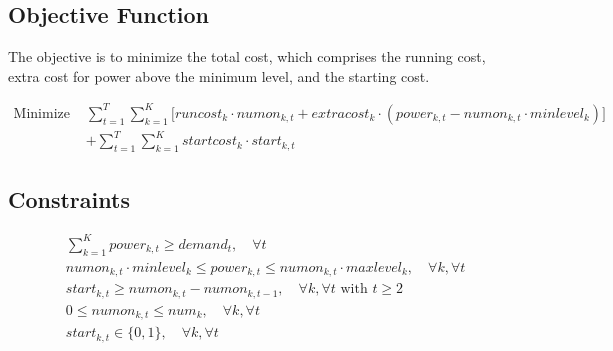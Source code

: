 \documentclass{article}
\begin{document}
\subsection{Objective Function}
The objective is to minimize the total cost, which comprises the running cost, extra cost for power above the minimum level, and the starting cost. 

\begin{align}
\text{Minimize } & \sum_{t=1}^{T} \sum_{k=1}^{K} \big[ runcost_k \cdot numon_{k,t} + extracost_k \cdot (power_{k,t} - numon_{k,t} \cdot minlevel_k) \big] \\
& + \sum_{t=1}^{T} \sum_{k=1}^{K} startcost_k \cdot start_{k,t}
\end{align}

\subsection{Constraints}
\begin{align}
& \sum_{k=1}^{K} power_{k,t} \geq demand_t, \quad \forall t \\

& numon_{k,t} \cdot minlevel_k \leq power_{k,t} \leq numon_{k,t} \cdot maxlevel_k, \quad \forall k, \forall t \\

& start_{k,t} \geq numon_{k,t} - numon_{k,t-1}, \quad \forall k, \forall t \text{ with } t \geq 2 \\

& 0 \leq numon_{k,t} \leq num_k, \quad \forall k, \forall t \\

& start_{k,t} \in \{0, 1\}, \quad \forall k, \forall t
\end{align}
\end{document}

